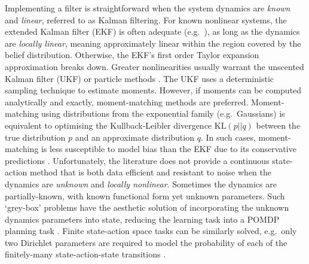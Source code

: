 \documentclass{article}
\begin{document}
Implementing a filter is straightforward
when the system dynamics are \textit{known} and \textit{linear},
referred to as Kalman filtering.
For known nonlinear systems,
the extended Kalman filter (EKF) is often adequate (e.g.\ \cite{van2012efficient}),
as long as the dynamics are \textit{locally linear},
meaning approximately linear within the region covered by the belief distribution. %
Otherwise, the EKF's first order Taylor expansion approximation breaks down.
Greater nonlinearities usually warrant the unscented Kalman filter (UKF)
or particle methods \cite{bayesFilters,particleMethods}.
The UKF uses a deterministic sampling technique to estimate moments.
However, if moments can be computed analytically and exactly,
moment-matching methods are preferred.
Moment-matching using distributions from the exponential family (e.g.\ Gaussians)
is equivalent to optimising the Kullback-Leibler divergence $\text{KL}(p||q)$
between the true distribution $p$ and an approximate
distribution $q$.
In such cases, moment-matching is less susceptible to model bias than the EKF %
due to its conservative predictions \cite{deisenroth2013}.
%
Unfortunately, the literature does
not provide a continuous state-action method that is both data efficient and resistant to noise
when the dynamics are \textit{unknown} and \textit{locally nonlinear}.
Sometimes the dynamics are partially-known, with known functional form yet unknown parameters.
Such `grey-box' problems have the aesthetic solution of incorporating
the unknown dynamics parameters into state,
reducing the learning task into a POMDP planning task \cite{duff2002,webb2014online,ross2008bayesian}.
Finite state-action space tasks can be similarly solved,
e.g.\ only two Dirichlet parameters are required to model the probability of each
of the finitely-many state-action-state transitions \cite{poupart2006}.
\end{document}
